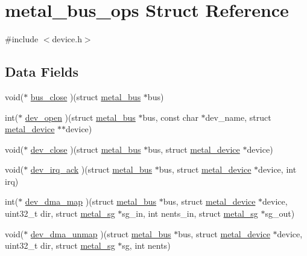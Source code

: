 \hypertarget{structmetal__bus__ops}{}\section{metal\+\_\+bus\+\_\+ops Struct Reference}
\label{structmetal__bus__ops}


{\ttfamily \#include $<$device.\+h$>$}

\subsection*{Data Fields}
\begin{DoxyCompactItemize}
\item 
void($\ast$ \hyperlink{structmetal__bus__ops_a004a5aa3614bc3755a926f1b11d1ceed}{bus\+\_\+close} )(struct \hyperlink{structmetal__bus}{metal\+\_\+bus} $\ast$bus)
\item 
int($\ast$ \hyperlink{structmetal__bus__ops_aaa736e0c899395854728a82f1dae22fd}{dev\+\_\+open} )(struct \hyperlink{structmetal__bus}{metal\+\_\+bus} $\ast$bus, const char $\ast$dev\+\_\+name, struct \hyperlink{structmetal__device}{metal\+\_\+device} $\ast$$\ast$device)
\item 
void($\ast$ \hyperlink{structmetal__bus__ops_adb17fa0506b8a5c07addcf5ace6040be}{dev\+\_\+close} )(struct \hyperlink{structmetal__bus}{metal\+\_\+bus} $\ast$bus, struct \hyperlink{structmetal__device}{metal\+\_\+device} $\ast$device)
\item 
void($\ast$ \hyperlink{structmetal__bus__ops_a421a2c69b568fa09c45738b67ec149d3}{dev\+\_\+irq\+\_\+ack} )(struct \hyperlink{structmetal__bus}{metal\+\_\+bus} $\ast$bus, struct \hyperlink{structmetal__device}{metal\+\_\+device} $\ast$device, int irq)
\item 
int($\ast$ \hyperlink{structmetal__bus__ops_afb63c10766ec71852d057d451d2d4432}{dev\+\_\+dma\+\_\+map} )(struct \hyperlink{structmetal__bus}{metal\+\_\+bus} $\ast$bus, struct \hyperlink{structmetal__device}{metal\+\_\+device} $\ast$device, uint32\+\_\+t dir, struct \hyperlink{structmetal__sg}{metal\+\_\+sg} $\ast$sg\+\_\+in, int nents\+\_\+in, struct \hyperlink{structmetal__sg}{metal\+\_\+sg} $\ast$sg\+\_\+out)
\item 
void($\ast$ \hyperlink{structmetal__bus__ops_ab31a9a4f78412c4eae3f7e4ecb92137d}{dev\+\_\+dma\+\_\+unmap} )(struct \hyperlink{structmetal__bus}{metal\+\_\+bus} $\ast$bus, struct \hyperlink{structmetal__device}{metal\+\_\+device} $\ast$device, uint32\+\_\+t dir, struct \hyperlink{structmetal__sg}{metal\+\_\+sg} $\ast$sg, int nents)
\end{DoxyCompactItemize}


